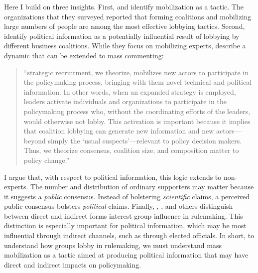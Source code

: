 Here I build on three insights. First, \citet{Furlong1997} and  \citet{Kerwin2011} identify mobilization as a tactic. The organizations that they surveyed reported that forming coalitions and mobilizing large numbers of people are among the most effective lobbying tactics. Second, \citet{Nelson2012} identify political information as a potentially influential result of lobbying by different business coalitions. While they focus on mobilizing experts, \citet{Nelson2012} describe a dynamic that can be extended to mass commenting: 
\begin{quote}
``strategic recruitment, we theorize, mobilizes new actors to participate in the policymaking process, bringing with them novel technical and political information. In other words, when an expanded strategy is employed, leaders activate individuals and organizations to participate in the policymaking process who, without the coordinating efforts of the leaders, would otherwise not lobby. This activation is important because it implies that coalition lobbying can generate new information and new actors---beyond simply the `usual suspects'---relevant to policy decision makers. Thus, we theorize consensus, coalition size, and composition matter to policy change.'' 
\end{quote}
I argue that, with respect to political information, this logic extends to non-experts. The number and distribution of ordinary supporters may matter because it suggests a \textit{public} consensus. Instead of bolstering \textit{scientific} claims, a perceived public consensus bolsters \textit{political} claims.
Finally, \citet{Furlong1998}, \citet{Yackee2006JPART}, and others distinguish between direct and indirect forms interest group influence in rulemaking. This distinction is especially important for political information, which may be most influential through indirect channels, such as through elected officials. In short, to understand how groups lobby in rulemaking, we must understand mass mobilization as a tactic aimed at producing political information that may have direct and indirect impacts on policymaking.%


